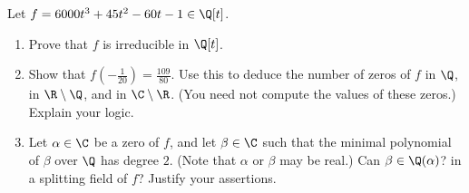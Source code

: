 %
%

\noindent{}Let $f = 6000 t^3 + 45 t^2 - 60 t - 1 \in \Q[t]$.
\begin{enumerate}[label=(\alph*)]
\item\label{itm : LQ05Ba} Prove that $f$ is irreducible in $\Q[t]$.
\item\label{itm : LQ05Bb} Show that $f(-\frac{1}{20}) = \frac{109}{80}$. Use this to deduce the number of zeros of $f$ in $\Q$, in $\R \setminus \Q$, and in $\C \setminus \R$. (You need not compute the values of these zeros.) Explain your logic.
\item\label{itm : LQ05Bc} Let $\alpha \in \C$ be a zero of $f$, and let $\beta \in \C$ such that the minimal polynomial of $\beta$ over $\Q$ has degree $2$. (Note that $\alpha$ or $\beta$ may be real.) Can $\beta \in \Q(\alpha)$? in a splitting field of $f$? Justify your assertions.
\end{enumerate}

